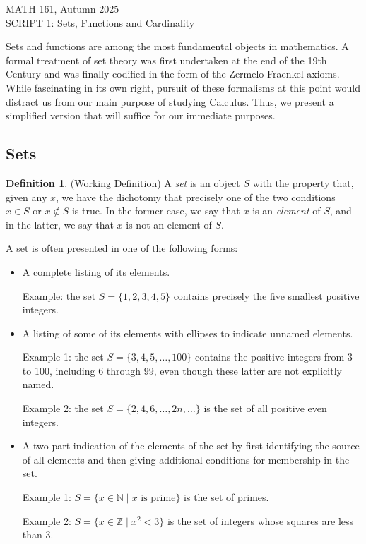 \documentclass[11pt]{article}
\newcommand{\head}[1]{
	\begin{center}
		{\large #1}
		\vspace{.2 in}
	\end{center}
	
	\bigskip 
}
\theoremstyle{definition}
\newtheorem{definition}[theorem]{Definition}
\numberwithin{equation}{subsection}
\begin{document}
\pagestyle{plain}


\setcounter{section}{1}   

\head{MATH 161, Autumn 2025\\ SCRIPT 1: Sets, Functions and Cardinality } 




Sets and functions are among the most fundamental objects in mathematics.  A formal treatment
of set theory was first undertaken at the end of the 19th Century and was finally codified
in the form of the Zermelo-Fraenkel axioms.  While fascinating in its own right, pursuit of these
formalisms at this point would distract us from our main purpose of studying Calculus.  Thus, we
present a simplified version that will suffice for our immediate purposes.



\subsection*{Sets}

\begin{definition} (Working Definition)
A {\em set} is an object $S$ with the property that, given any $x$, we have the dichotomy that precisely
one of the two conditions $x\in S$ or $x\not\in S$ is true.  In the former case, we say that $x$ is an 
{\em element} of $S$, and in the latter, we say that $x$ is not an element of $S$.
\end{definition}


A set is often presented in one of the following forms:
\begin{itemize}
\item
A complete listing of its elements.

Example:  the set $S=\{1,2,3,4,5\}$ contains precisely the 
five smallest positive integers.


\item
A listing of some of its elements with ellipses to indicate unnamed elements.

Example 1:  the set $S=\{3, 4, 5, \ldots, 100\}$ contains the positive integers from 3 to 100,
including 6 through 99, even though these latter are not explicitly named.  


Example 2:  the set $S=\{2, 4, 6, \ldots, 2n, \ldots \}$ is the set of all positive even integers.


\item
A two-part indication of the elements of the set by first identifying the source of all elements
and then giving additional conditions for membership in the set.

Example 1: 
$S=\{x\in {\mathbb N}\mid \mbox{$x$ is prime}\}$ is the set of primes.  


Example 2:
$S=\{x\in {\mathbb Z}\mid \mbox{$x^2<3$}\}$ is the set of integers whose squares are less than 3.
\end{itemize}
\end{document}
